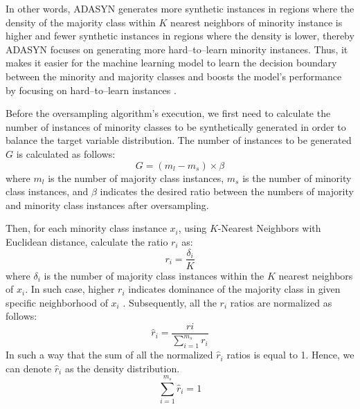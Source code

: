 In other words, ADASYN generates more synthetic instances in regions where the density of the majority class within $K$ nearest neighbors of minority instance is higher and fewer synthetic instances in regions where the density is lower, thereby ADASYN focuses on generating more hard--to--learn minority instances.
Thus, it makes it easier for the machine learning model to learn the decision boundary between the minority and majority classes and boosts the model's performance by focusing on hard--to--learn instances \citep{adasynhaibo}.


Before the oversampling algorithm's execution, we first need to calculate the number of instances of minority classes to be synthetically generated in order to balance the target variable distribution. The number of instances to be generated $G$ is calculated as follows:
\begin{equation}\label{eq}
G = \left(m_{l} - m_{s}\right) \times \beta
\end{equation}
where $m_l$ is the number of majority class instances, $m_s$ is the number of minority class instances, and $\beta$ indicates the desired ratio between the numbers of majority and minority class instances after oversampling.

Then, for each minority class instance $x_i$, using $K$-Nearest Neighbors with Euclidean distance, calculate the ratio $r_i$ as:
\begin{equation}\label{eq}
    r_{i} = \frac{\delta_{i}} {K}
\end{equation}
where $\delta_{i}$ is the number of majority class instances within the $K$ nearest neighbors of $x_i$.
In such case, higher $r_i$ indicates dominance of the majority class in given specific neighborhood of $x_i$ \citep{nian2018introduction}.
Subsequently, all the $r_i$ ratios are normalized as follows:
\begin{equation}\label{eq}
\hat{r}_{i} = \frac{r{i}}{\displaystyle\sum_{i=1}^{m_{s}} r_{i}}
\end{equation}
In such a way that the sum of all the normalized $\hat{r}_i$ ratios is equal to 1. Hence, we can denote $\hat{r}_i$ as the density distribution.
\begin{equation}\label{eq}
\sum_{i=1}^{m_{s}} \hat{r}_{i} = 1
\end{equation}


